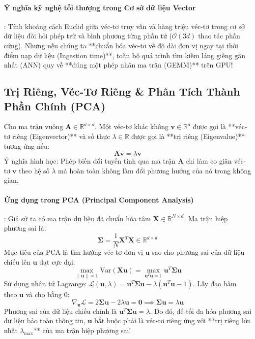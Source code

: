 \paragraph{Ý nghĩa kỹ nghệ tối thượng trong Cơ sở dữ liệu Vector}:
Tính khoảng cách Euclid giữa véc-tơ truy vấn và hàng triệu véc-tơ trong cơ sở dữ liệu đòi hỏi phép trừ và bình phương từng phần tử ($\mathcal{O}(3d)$ thao tác phần cứng). Nhưng nếu chúng ta **chuẩn hóa véc-tơ về độ dài đơn vị ngay tại thời điểm nạp dữ liệu (Ingestion time)**, toàn bộ quá trình tìm kiếm láng giềng gần nhất (ANN) quy về **đúng một phép nhân ma trận (GEMM)** trên GPU!

\subsection{Trị Riêng, Véc-Tơ Riêng \& Phân Tích Thành Phần Chính (PCA)}
Cho ma trận vuông $\mathbf{A} \in \mathbb{R}^{d \times d}$. Một véc-tơ khác không $\mathbf{v} \in \mathbb{R}^d$ được gọi là **véc-tơ riêng (Eigenvector)** và số thực $\lambda \in \mathbb{R}$ được gọi là **trị riêng (Eigenvalue)** tương ứng nếu:
\begin{equation}
\mathbf{A} \mathbf{v} = \lambda \mathbf{v}
\end{equation}
Ý nghĩa hình học: Phép biến đổi tuyến tính qua ma trận $\mathbf{A}$ chỉ làm co giãn véc-tơ $\mathbf{v}$ theo hệ số $\lambda$ mà hoàn toàn không làm đổi phương hướng của nó trong không gian.

\paragraph{Ứng dụng trong PCA (Principal Component Analysis)}:
Giả sử ta có ma trận dữ liệu đã chuẩn hóa tâm $\mathbf{X} \in \mathbb{R}^{N \times d}$. Ma trận hiệp phương sai là:
\begin{equation}
\mathbf{\Sigma} = \frac{1}{N} \mathbf{X}^T \mathbf{X} \in \mathbb{R}^{d \times d}
\end{equation}
Mục tiêu của PCA là tìm hướng véc-tơ đơn vị $\mathbf{u}$ sao cho phương sai của dữ liệu chiếu lên $\mathbf{u}$ đạt cực đại:
\begin{equation}
\max_{\|\mathbf{u}\|=1} \text{Var}(\mathbf{X} \mathbf{u}) = \max_{\mathbf{u}^T \mathbf{u} = 1} \mathbf{u}^T \mathbf{\Sigma} \mathbf{u}
\end{equation}
Sử dụng nhân tử Lagrange: $\mathcal{L}(\mathbf{u}, \lambda) = \mathbf{u}^T \mathbf{\Sigma} \mathbf{u} - \lambda (\mathbf{u}^T \mathbf{u} - 1)$. Lấy đạo hàm theo $\mathbf{u}$ và cho bằng $0$:
\begin{equation}
\nabla_{\mathbf{u}} \mathcal{L} = 2 \mathbf{\Sigma} \mathbf{u} - 2 \lambda \mathbf{u} = \mathbf{0} \implies \mathbf{\Sigma} \mathbf{u} = \lambda \mathbf{u}
\end{equation}
Phương sai của dữ liệu chiếu chính là $\mathbf{u}^T \mathbf{\Sigma} \mathbf{u} = \lambda$. Do đó, để tối đa hóa phương sai dữ liệu bảo toàn thông tin, $\mathbf{u}$ bắt buộc phải là véc-tơ riêng ứng với **trị riêng lớn nhất $\lambda_{\max}$** của ma trận hiệp phương sai!

